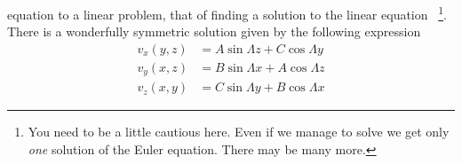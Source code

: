 equation to a linear problem, that of finding a solution to the linear
equation ~\footnote{You need to be a little
  cautious here. Even if we manage to solve  we get
  only \textit{one} solution of the Euler equation. There may be many
  more. }. 
There is a wonderfully symmetric solution given by the following
expression
\begin{subequations}
\begin{align}
v_x(y,z) &=   A \sin \Lambda z + C \cos \Lambda y \\
 v_y(x,z) &=  B \sin \Lambda x +  A \cos \Lambda z \\
 v_z(x,y) &=  C \sin \Lambda y +  B \cos \Lambda x 
\end{align}
\label{A2.2:ABC}
\end{subequations}
